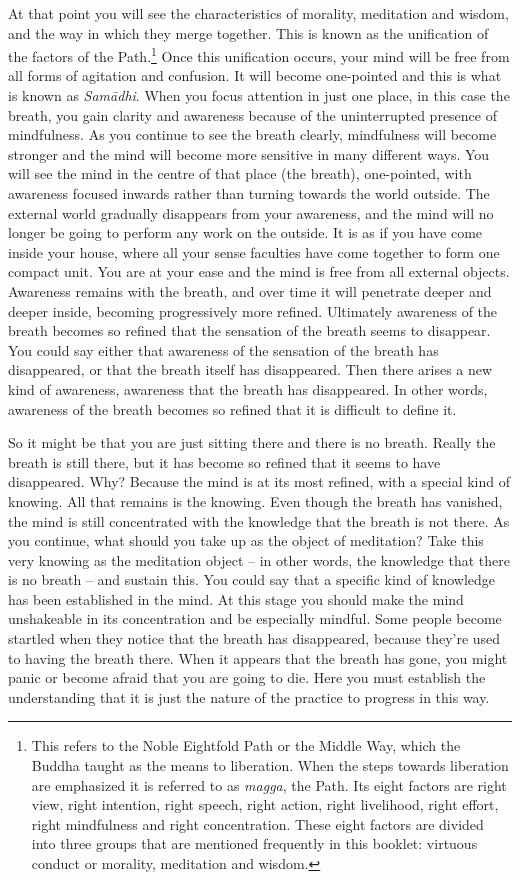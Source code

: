 At that point you will see the characteristics of morality, meditation and wisdom, and the way in which they merge together. This is known as the unification of the factors of the Path.\footnote{This refers to the Noble Eightfold Path or the Middle Way, which the Buddha taught as the means to liberation. When the steps towards liberation are emphasized it is referred to as \textit{magga}, the Path. Its eight factors are right view, right intention, right speech, right action, right livelihood, right effort, right mindfulness and right concentration. These eight factors are divided into three groups that are mentioned frequently in this booklet: virtuous conduct or morality, meditation and wisdom.} Once this unification occurs, your mind will be free from all forms of agitation and confusion. It will become one-pointed and this is what is known as \textit{Sam\=adhi}. When you focus attention in just one place, in this case the breath, you gain clarity and awareness because of the uninterrupted presence of mindfulness. As you continue to see the breath clearly, mindfulness will become stronger and the mind will become more sensitive in many different ways. You will see the mind in the centre of that place (the breath), one-pointed, with awareness focused inwards rather than turning towards the world outside. The external world gradually disappears from your awareness, and the mind will no longer be going to perform any work on the outside. It is as if you have come inside your house, where all your sense faculties have come together to form one compact unit. You are at your ease and the mind is free from all external objects. Awareness remains with the breath, and over time it will penetrate deeper and deeper inside, becoming progressively more refined. Ultimately awareness of the breath becomes so refined that the sensation of the breath seems to disappear. You could say either that awareness of the sensation of the breath has disappeared, or that the breath itself has disappeared. Then there arises a new kind of awareness, awareness that the breath has disappeared. In other words, awareness of the breath becomes so refined that it is difficult to define it.

So it might be that you are just sitting there and there is no breath. Really the breath is still there, but it has become so refined that it seems to have disappeared. Why? Because the mind is at its most refined, with a special kind of knowing. All that remains is the knowing. Even though the breath has vanished, the mind is still concentrated with the knowledge that the breath is not there. As you continue, what should you take up as the object of meditation? Take this very knowing as the meditation object -- in other words, the knowledge that there is no breath -- and sustain this. You could say that a specific kind of knowledge has been established in the mind. At this stage you should make the mind unshakeable in its concentration and be especially mindful. Some people become startled when they notice that the breath has disappeared, because they're used to having the breath there. When it appears that the breath has gone, you might panic or become afraid that you are going to die. Here you must establish the understanding that it is just the nature of the practice to progress in this way.

